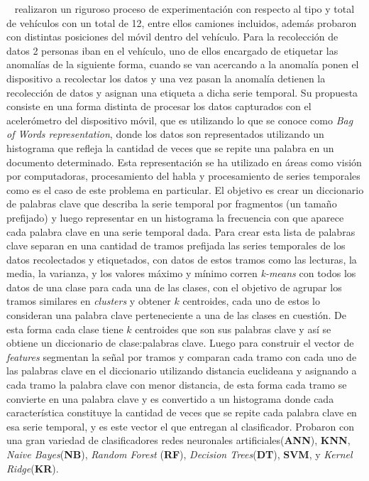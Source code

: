 ~\parencite{gonzalez2017learning} realizaron un riguroso proceso de experimentación con respecto al tipo y total de vehículos con un total de 12, entre ellos camiones incluidos,
además probaron con distintas posiciones del móvil dentro del vehículo. Para la recolección de datos 2 personas iban en el vehículo, uno de ellos encargado de etiquetar las
anomalías de la siguiente forma, cuando se van acercando a la anomalía ponen el dispositivo a recolectar los datos y una vez pasan la anomalía detienen la recolección de datos
y asignan una etiqueta a dicha serie temporal. Su propuesta consiste en una forma distinta de procesar los datos capturados con el acelerómetro del dispositivo móvil, que es
utilizando lo que se conoce como \emph{Bag of Words representation}, donde los datos son representados utilizando un histograma que refleja la cantidad de veces que se repite
una palabra en un documento determinado. Esta representación se ha utilizado en áreas como visión por computadoras, procesamiento del habla y procesamiento de series temporales
como es el caso de este problema en particular. El objetivo es crear un diccionario de palabras clave que describa la serie temporal por fragmentos (un tamaño prefijado) y luego
representar en un histograma la frecuencia con que aparece cada palabra clave en una serie temporal dada. Para crear esta lista de palabras clave separan en una cantidad de tramos 
prefijada las series temporales de los datos recolectados y etiquetados, con datos de estos tramos como las lecturas, la media, la varianza, y los valores máximo y mínimo corren
\emph{k-means} con todos los datos de una clase para cada una de las clases, con el objetivo de agrupar los tramos similares en \emph{clusters} y obtener $k$ centroides, cada uno
de estos lo consideran una palabra clave perteneciente a una de las clases en cuestión. De esta forma cada clase tiene $k$ centroides que son sus palabras clave y así se obtiene 
un diccionario de clase:palabras clave. Luego para construir el vector de \emph{features} segmentan la señal por tramos y comparan cada tramo con cada uno de las palabras clave 
en el diccionario utilizando distancia euclideana y asignando a cada tramo la palabra clave con menor distancia, de esta forma cada tramo se convierte en una palabra clave y es 
convertido a un histograma donde cada característica constituye la cantidad de veces que se repite cada palabra clave en esa serie temporal, y es este vector el que entregan al 
clasificador. Probaron con una gran variedad de clasificadores redes neuronales artificiales(\textbf{ANN}), \textbf{KNN}, \emph{Naive Bayes}(\textbf{NB}), \emph{Random Forest}
(\textbf{RF}), \emph{Decision Trees}(\textbf{DT}), \textbf{SVM}, y \emph{Kernel Ridge}(\textbf{KR}).\\
